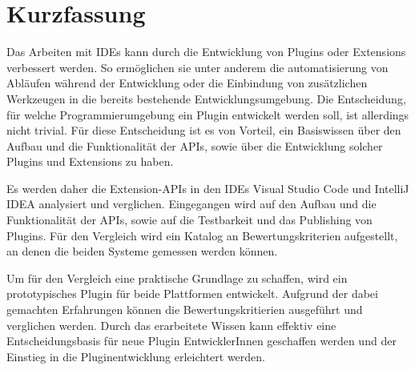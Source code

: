 \chapter{Kurzfassung}

Das Arbeiten mit IDEs kann durch die Entwicklung von 
Plugins oder Extensions verbessert werden. So ermöglichen sie unter
anderem die automatisierung von Abläufen während der Entwicklung oder
die Einbindung von zusätzlichen Werkzeugen in die bereits bestehende
Entwicklungsumgebung. Die Entscheidung,
für welche Programmierumgebung ein Plugin entwickelt werden soll,
ist allerdings nicht trivial. Für diese Entscheidung ist es von Vorteil,
ein Basiswissen über den Aufbau und die Funktionalität der APIs,
sowie über die Entwicklung solcher Plugins und Extensions zu haben.

Es werden daher die Extension-APIs in den IDEs Visual Studio Code
und IntelliJ IDEA analysiert und verglichen. Eingegangen wird
auf den Aufbau und die Funktionalität der APIs, sowie 
auf die Testbarkeit und das Publishing von Plugins.
Für den Vergleich wird ein Katalog an Bewertungskriterien aufgestellt, 
an denen die beiden Systeme gemessen werden können.

Um für den Vergleich eine praktische Grundlage zu schaffen, wird
ein prototypisches Plugin für beide Plattformen entwickelt. Aufgrund
der dabei gemachten Erfahrungen können die Bewertungskritierien
ausgeführt und verglichen werden. Durch das erarbeitete Wissen
kann effektiv eine Entscheidungsbasis für neue Plugin EntwicklerInnen
geschaffen werden und der Einstieg in die Pluginentwicklung 
erleichtert werden.